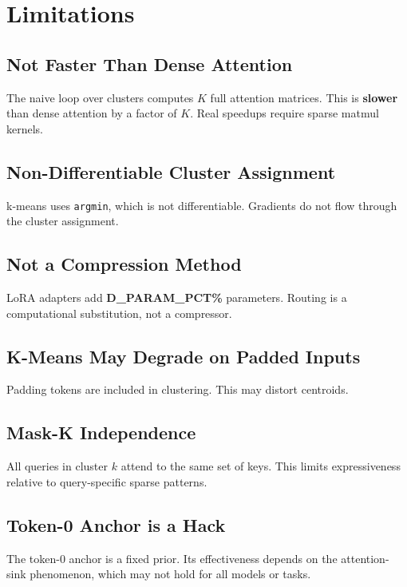 
\section{Limitations}

\subsection{Not Faster Than Dense Attention}

The naive loop over clusters computes $K$ full attention matrices. This is 
\textbf{slower} than dense attention by a factor of $K$. Real speedups require 
sparse matmul kernels.

\subsection{Non-Differentiable Cluster Assignment}

k-means uses \texttt{argmin}, which is not differentiable. Gradients do not flow 
through the cluster assignment.

\subsection{Not a Compression Method}

LoRA adapters add \textbf{{{D\_PARAM\_PCT}}\%} parameters. Routing is a computational 
substitution, not a compressor.

\subsection{K-Means May Degrade on Padded Inputs}

Padding tokens are included in clustering. This may distort centroids.

\subsection{Mask-K Independence}

All queries in cluster $k$ attend to the same set of keys. This limits 
expressiveness relative to query-specific sparse patterns.

\subsection{Token-0 Anchor is a Hack}

The token-0 anchor is a fixed prior. Its effectiveness depends on the 
attention-sink phenomenon, which may not hold for all models or tasks.

